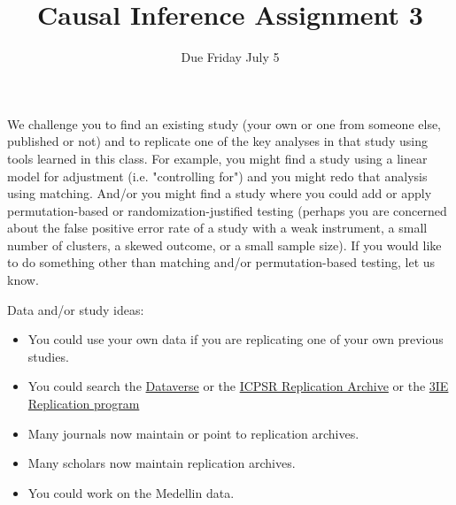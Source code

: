 \documentclass{article}
\title{Causal Inference Assignment 3}
\author{Due Friday July 5}
\begin{document}
\maketitle

We challenge you to find an existing study (your own or one from someone else,
published or not) and to replicate one of the key analyses in that study using
tools learned in this class. For example, you might find a study using a linear
model for adjustment (i.e. "controlling for") and you might redo that analysis
using matching. And/or you might find a study where you could add or apply
permutation-based or randomization-justified testing (perhaps you are concerned
about the false positive error rate of a study with a weak instrument, a small
number of clusters, a skewed outcome, or a small sample size). If you would like
to do something other than matching and/or permutation-based testing, let us
know.

Data and/or study ideas: \begin{itemize}
 \item You could use your own data if you are replicating one of your own
      previous studies.
 \item You could search the \href{http://dataverse.org/}{Dataverse} or the
      \href{http://www.icpsr.umich.edu/icpsrweb/deposit/pra/index.jsp}{ICPSR
      Replication Archive} or the
      \href{http://www.3ieimpact.org/evaluation/impact-evaluation-replication-programme/}{3IE
      Replication program}
 \item Many journals now maintain or point to replication archives.
 \item Many scholars now maintain replication archives.
 \item You could work on the Medellin data.
\end{itemize}
\end{document}
